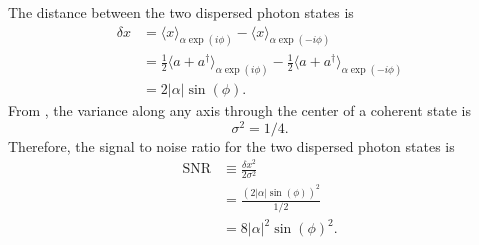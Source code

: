 The distance between the two dispersed photon states is \begin{align}
\delta x &=
\langle x \rangle_{\alpha \exp(i \phi)} - \langle x \rangle_{\alpha \exp(-i \phi)} \\
&= \frac{1}{2}\langle a + a^{\dagger} \rangle_{\alpha \exp(i \phi)} - \frac{1}{2}\langle a + a^{\dagger} \rangle_{\alpha \exp(-i \phi)} \\
&= 2| \alpha | \sin \left( \phi \right) . \end{align}
From \citeinternaltype {}, the variance along any axis through the center of a coherent state is \begin{equation}
\sigma^2 = 1/4 . \end{equation}
Therefore, the signal to noise ratio for the two dispersed photon states is \begin{align}
\text{SNR}
&\equiv \frac{\delta x^2}{2 \sigma^2} \\
&= \frac{\left( 2 | \alpha | \sin \left( \phi \right) \right)^2}{1/2} \\
&= 8 \left| \alpha \right|^2 \sin \left(\phi \right)^2 . \label{eq:dispersedSNR}
\end{align}



